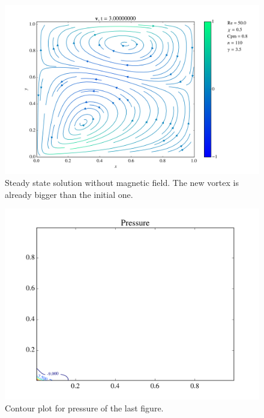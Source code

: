 \documentclass[journal]{IEEEtran}
\begin{document}
\begin{figure}[!t]
\centering
\includegraphics[width=\linewidth]{figures/Re050/w/vectorField}
\caption{Steady state solution without magnetic field. The new vortex is already bigger than the initial one. \label{Re050wVectorField}}
\end{figure}

\begin{figure}[!t]
\centering
\includegraphics[width=\linewidth]{figures/Re050/w/pressure}
\caption{Contour plot for pressure of the last figure. \label{Re050wPressure}}
\end{figure}
\end{document}
